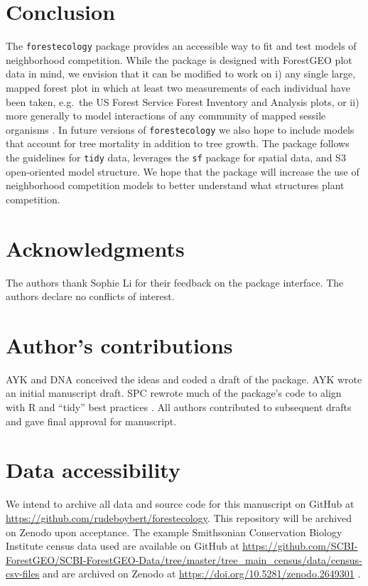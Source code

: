 \documentclass[12pt]{article}
\begin{document}
\hypertarget{conclusion}{%
\section{Conclusion}\label{conclusion}}

The \texttt{forestecology} package provides an accessible way to fit and
test models of neighborhood competition. While the package is designed
with ForestGEO plot data in mind, we envision that it can be modified to
work on i) any single large, mapped forest plot in which at least two
measurements of each individual have been taken, e.g.~the US Forest
Service Forest Inventory and Analysis plots, or ii) more generally to
model interactions of any community of mapped sessile organisms
\citep{smith_forest_2002}. In future versions of \texttt{forestecology}
we also hope to include models that account for tree mortality in
addition to tree growth. The package follows the guidelines for
\texttt{tidy} data, leverages the \texttt{sf} package for spatial data,
and S3 open-oriented model structure. We hope that the package will
increase the use of neighborhood competition models to better understand
what structures plant competition.

\hypertarget{acknowledgments}{%
\section{Acknowledgments}\label{acknowledgments}}

The authors thank Sophie Li for their feedback on the package interface.
The authors declare no conflicts of interest.

\hypertarget{authors-contributions}{%
\section{Author's contributions}\label{authors-contributions}}

AYK and DNA conceived the ideas and coded a draft of the package. AYK
wrote an initial manuscript draft. SPC rewrote much of the package's
code to align with R and ``tidy'' best practices
\citep{wickham_welcome_2019}. All authors contributed to subsequent
drafts and gave final approval for manuscript.

\hypertarget{data-accessibility}{%
\section{Data accessibility}\label{data-accessibility}}

We intend to archive all data and source code for this manuscript on
GitHub at \url{https://github.com/rudeboybert/forestecology}. This
repository will be archived on Zenodo upon acceptance. The example
Smithsonian Conservation Biology Institute census data used are
available on GitHub at
\url{https://github.com/SCBI-ForestGEO/SCBI-ForestGEO-Data/tree/master/tree_main_census/data/census-csv-files}
and are archived on Zenodo at
\url{https://doi.org/10.5281/zenodo.2649301}
\citep{gonzalez-akre_scbi-forestgeoscbi-forestgeo-data_2020}.



\end{document}
